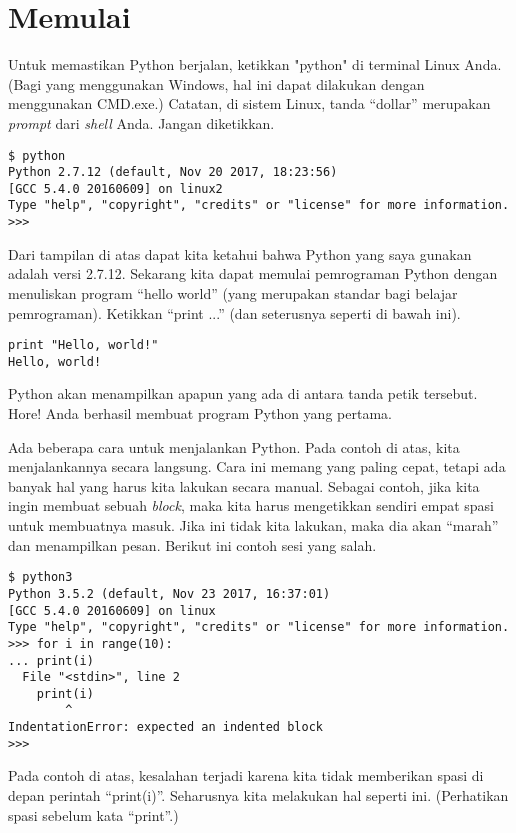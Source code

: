 \section{Memulai}
Untuk memastikan Python berjalan, ketikkan "python" di terminal Linux Anda.
(Bagi yang menggunakan Windows, hal ini dapat dilakukan dengan menggunakan
CMD.exe.) Catatan, di sistem Linux, tanda ``dollar'' merupakan {\em prompt}
dari {\em shell} Anda. Jangan diketikkan.

\begin{verbatim}
$ python
Python 2.7.12 (default, Nov 20 2017, 18:23:56) 
[GCC 5.4.0 20160609] on linux2
Type "help", "copyright", "credits" or "license" for more information.
>>> 
\end{verbatim}

Dari tampilan di atas dapat kita ketahui bahwa Python yang saya gunakan adalah
versi 2.7.12. Sekarang kita dapat memulai pemrograman Python dengan menuliskan
program ``hello world'' (yang merupakan standar bagi belajar pemrograman).
Ketikkan ``print ...'' (dan seterusnya seperti di bawah ini).

\begin{verbatim}
print "Hello, world!"
Hello, world!
\end{verbatim}

Python akan menampilkan apapun yang ada di antara tanda petik tersebut. Hore!
Anda berhasil membuat program Python yang pertama.

Ada beberapa cara untuk menjalankan Python. Pada contoh di atas, kita
menjalankannya secara langsung. Cara ini memang yang paling cepat, tetapi ada
banyak hal yang harus kita lakukan secara manual. Sebagai contoh, jika kita
ingin membuat sebuah {\em block}, maka kita harus mengetikkan sendiri empat
spasi untuk membuatnya masuk. Jika ini tidak kita lakukan, maka dia akan
``marah'' dan menampilkan pesan. Berikut ini contoh sesi yang salah.

\begin{verbatim}
$ python3
Python 3.5.2 (default, Nov 23 2017, 16:37:01) 
[GCC 5.4.0 20160609] on linux
Type "help", "copyright", "credits" or "license" for more information.
>>> for i in range(10):
... print(i)
  File "<stdin>", line 2
    print(i)
        ^
IndentationError: expected an indented block
>>> 
\end{verbatim}

Pada contoh di atas, kesalahan terjadi karena kita tidak memberikan spasi di
depan perintah ``print(i)''. Seharusnya kita melakukan hal seperti ini.
(Perhatikan spasi sebelum kata ``print''.)


